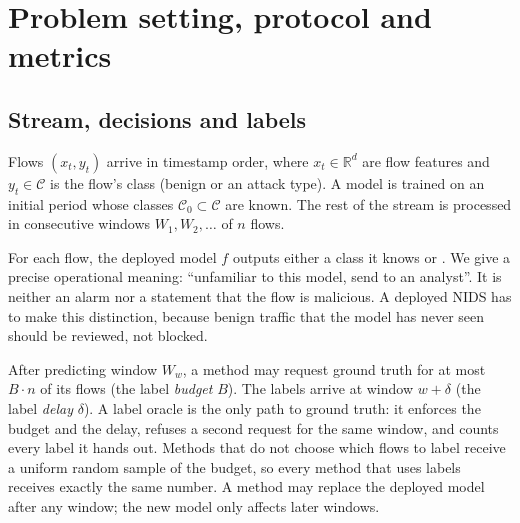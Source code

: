 \section{Problem setting, protocol and metrics}
\label{sec:problem}

\subsection{Stream, decisions and labels}
Flows $(x_t, y_t)$ arrive in timestamp order, where $x_t \in \mathbb{R}^d$ are flow features and $y_t \in
\mathcal{C}$ is the flow's class (benign or an attack type). A model is trained on an initial period whose
classes $\mathcal{C}_0 \subset \mathcal{C}$ are known. The rest of the stream is processed in consecutive windows
$W_1, W_2, \dots$ of $n$ flows.

For each flow, the deployed model $f$ outputs either a class it knows or \unk{}. We give \unk{} a precise
operational meaning: ``unfamiliar to this model, send to an analyst''. It is neither an alarm nor a statement
that the flow is malicious. A deployed NIDS has to make this distinction, because benign traffic that the model
has never seen should be reviewed, not blocked.

After predicting window $W_w$, a method may request ground truth for at most $B \cdot n$ of its flows (the label
\emph{budget} $B$). The labels arrive at window $w + \delta$ (the label \emph{delay} $\delta$). A label oracle is
the only path to ground truth: it enforces the budget and the delay, refuses a second request for the same
window, and counts every label it hands out. Methods that do not choose which flows to label receive a uniform
random sample of the budget, so every method that uses labels receives exactly the same number. A method may
replace the deployed model after any window; the new model only affects later windows.

